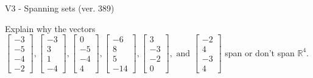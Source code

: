 \begin{exercise}
  \begin{exerciseTitle}V3 - Spanning sets (ver. 389)\end{exerciseTitle}
  \begin{exerciseStatement}
    Explain why the vectors \(\left[\begin{array}{r}
-3 \\
-5 \\
-4 \\
-2
\end{array}\right] , \left[\begin{array}{r}
-3 \\
3 \\
1 \\
-4
\end{array}\right] , \left[\begin{array}{r}
0 \\
-5 \\
-4 \\
4
\end{array}\right] , \left[\begin{array}{r}
-6 \\
8 \\
5 \\
-14
\end{array}\right] , \left[\begin{array}{r}
3 \\
-3 \\
-2 \\
0
\end{array}\right] , \text{ and } \left[\begin{array}{r}
-2 \\
4 \\
-3 \\
4
\end{array}\right]\) span or don't span \(\mathbb{R}^4\). 
	



\end{exerciseStatement}
\end{exercise}
